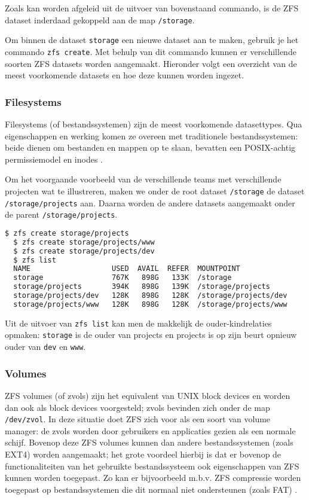 Zoals kan worden afgeleid uit de uitvoer van bovenstaand commando, is de ZFS dataset inderdaad gekoppeld aan de map \texttt{/storage}.

Om binnen de dataset \texttt{storage} een nieuwe dataset aan te maken, gebruik je het commando \texttt{zfs create}. Met behulp van dit commando kunnen er verschillende soorten ZFS datasets worden aangemaakt. Hieronder volgt een overzicht van de meest voorkomende datasets en hoe deze kunnen worden ingezet.

\subsubsection{Filesystems}

Filesystems (of bestandssystemen) zijn de meest voorkomende datasettypes. Qua eigenschappen en werking komen ze overeen met traditionele bestandssystemen: beide dienen om bestanden en mappen op te slaan, bevatten een POSIX-achtig permissiemodel en inodes \autocite{Lucas2015}. 

Om het voorgaande voorbeeld van de verschillende teams met verschillende projecten wat te illustreren, maken we onder de root dataset \texttt{/storage} de dataset \texttt{/storage/projects} aan. Daarna worden de andere datasets aangemaakt onder de parent \texttt{/storage/projects}.

\begin{lstlisting}[language=bash,style=command_style] 
  $ zfs create storage/projects
  $ zfs create storage/projects/www
  $ zfs create storage/projects/dev
  $ zfs list
  NAME                   USED  AVAIL  REFER  MOUNTPOINT
  storage                767K   898G   133K  /storage
  storage/projects       394K   898G   139K  /storage/projects
  storage/projects/dev   128K   898G   128K  /storage/projects/dev
  storage/projects/www   128K   898G   128K  /storage/projects/www
\end{lstlisting}

Uit de uitvoer van \texttt{zfs list} kan men de makkelijk de ouder-kindrelaties opmaken: \texttt{storage} is de ouder van projects en projects is op zijn beurt opnieuw ouder van \texttt{dev} en \texttt{www}.

\subsubsection{Volumes}

ZFS volumes (of zvols) zijn het equivalent van UNIX block devices en worden dan ook als block devices voorgesteld; zvols bevinden zich onder de map \texttt{/dev/zvol}. In deze situatie doet ZFS zich voor als een soort van volume manager: de zvols worden door gebruikers en applicaties gezien als een normale schijf. Bovenop deze ZFS volumes kunnen dan andere bestandssystemen (zoals EXT4) worden aangemaakt; het grote voordeel hierbij is dat er bovenop de functionaliteiten van het gebruikte bestandssysteem ook eigenschappen van ZFS kunnen worden toegepast. Zo kan er bijvoorbeeld m.b.v. ZFS compressie worden toegepast op bestandssystemen die dit normaal niet ondersteunen (zoals FAT) \autocite{FBSDDP2017}.

